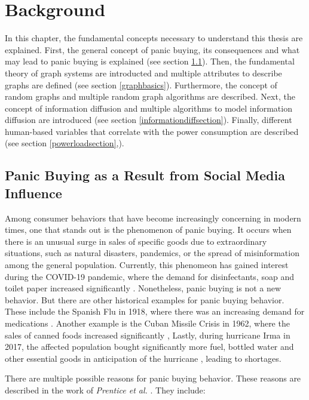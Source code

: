 \chapter{Background}
\label{background}

In this chapter, the fundamental concepts necessary to understand 
this thesis are explained.
First, the general concept of panic buying,
its consequences and what may lead to panic buying is explained 
(see section \ref{panicbuying}).
Then, the fundamental theory of graph systems are 
introducted and multiple attributes to describe graphs are defined 
(see section \ref{graphbasics}).
Furthermore, the concept of random graphs and multiple random 
graph algorithms are described.
Next, the concept of information diffusion
and multiple algorithms to model information diffusion are introduced
(see section \ref{informationdiffsection}).
Finally, different human-based variables that 
correlate with the power consumption are described
(see section \ref{powerloadsection},).


\section{Panic Buying as a Result from Social Media Influence}
\label{panicbuying}

Among consumer behaviors that have become increasingly concerning in modern times, 
one that stands out is the phenomenon of panic buying.
It occurs when there is an unusual surge in sales of 
specific goods due to extraordinary situations, such as natural disasters, 
pandemics, or the spread of misinformation among the general population.
Currently, this phenomeon has gained interest during the COVID-19 pandemic,
where the demand for disinfectants, soap and toilet paper increased significantly
\cite{covidpanicbuying}. Nonetheless, panic buying is not a new behavior.
But there are other historical examples for panic buying behavior.
These include the Spanish Flu
in 1918, where there was an increasing demand for medications 
\cite{honigsbaum2013regulating}. Another example is the Cuban Missile Crisis 
in 1962, where the sales of canned foods increased significantly \cite{george2004awaiting}, 
Lastly, during hurricane Irma in 2017, the affected population bought
significantly more fuel, bottled water 
and other essential goods in anticipation of the hurricane \cite{irmahurricane},
leading to shortages.

There are multiple possible reasons for panic buying behavior. These reasons 
are described in the work of \textit{Prentice et al.}
\cite{prentice2022antecedents}. They include:

